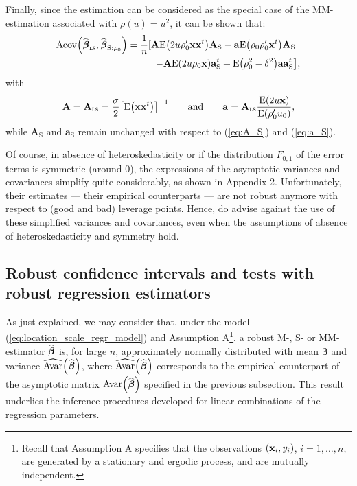 \begin{stremark}
Finally, since the  estimation can be considered as the special case of the
MM-estimation associated with $\rho(u)=u^{2}$, it can be shown that:%
\begin{align}
\mathrm{Acov}\left(  \sthat{\boldsymbol\beta}_{\stsc{LS}},\widehat
{\boldsymbol\beta}_{\mathrm{S};\rho_{0}}\right)   &  =\frac{1}{n}%
[\mathbf{A}\mathrm{E}\left(  2u\rho_{0}^{\prime}\mathbf{xx}^{t}\right)
\mathbf{A}_{\mathrm{S}}-\mathbf{a}\mathrm{E}\left(  \rho_{0}\rho_{0}^{\prime
}\stvec{x}^{t}\right)  \mathbf{A}_{\mathrm{S}}\label{eq:Acov_betahat_LS_S}\\
&  \hspace*{1cm}\left.  -\mathbf{A}\mathrm{E}\left(  2u\rho_{0}\stvec{x}%
\right)  \mathbf{a}_{\mathrm{S}}^{t}+\mathrm{E}\left(  \rho_{0}^{2}-\delta
^{2}\right)  \mathbf{aa}_{\mathrm{S}}^{t}\right]  ,\nonumber
\end{align}
with%
\[
\mathbf{A}=\mathbf{A}_{\stsc{LS}}=\frac{\sigma}{2}\left[  \mathrm{E}\left(
\mathbf{xx}^{t}\right)  \right]  ^{-1}\qquad\text{and\qquad}\mathbf{a}%
=\mathbf{A}_{\stsc{LS}}\frac{\mathrm{E}\left(  2u\stvec{x}\right)
}{\mathrm{E}\left(  \rho_{0}^{\prime}u_{0}\right)  },
\]
while $\mathbf{A}_{\mathrm{S}}$ and $\mathbf{a}_{\mathrm{S}}$ remain unchanged
with respect to (\ref{eq:A_S}) and (\ref{eq:a_S}).
\end{stremark}

Of course, in absence of heteroskedasticity or if the distribution $F_{0,1}$
of the error terms is symmetric (around 0), the expressions of the asymptotic
variances and covariances simplify quite considerably, as shown in Appendix 2.
Unfortunately, their estimates --- their empirical counterparts --- are not
robust anymore with respect to (good and bad) leverage points. Hence, 
\citet{Croux:2003} do advise against the use of these simplified variances
and covariances, even when the assumptions of absence of heteroskedasticity
and symmetry hold.

\bigskip

\subsection{Robust confidence intervals and tests with robust regression estimators}

As just explained, we may consider that, under the model
(\ref{eq:location_scale_regr_model}) and Assumption A\footnote{Recall that
Assumption A specifies that the observations $\left(  \stvec{x}_{i}%
,y_{i}\right)  $, $i = 1, \dots, n$, are generated by a stationary and ergodic
process, and are mutually independent.}, a robust M-, S- or MM-estimator
$\widehat{\boldsymbol\beta}$ is, for large $n$, approximately normally
distributed with mean $\boldsymbol\beta$ and variance $\widehat
{\mathrm{Avar}}\left(  \sthat{\boldsymbol\beta}\right)  $, where
$\sthat{\mathrm{Avar}}\left(  \sthat{\boldsymbol\beta}\right)  $
corresponds to the empirical counterpart of the asymptotic matrix
$\mathrm{Avar}\left(  \sthat{\boldsymbol\beta}\right)  $ specified in the
previous subsection. This result underlies the inference procedures developed
for linear combinations of the regression parameters.

